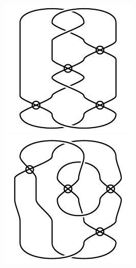 \begin{figure}[H]
\begin{minipage}[b]{.18\linewidth}
\centering
\includegraphics[width=\linewidth]{../data/virtual_4_82.png}
\end{minipage}
\begin{minipage}[b]{.18\linewidth}
\centering
\includegraphics[width=\linewidth]{../data/virtual_4_83.png}

\end{minipage}
\end{figure}
